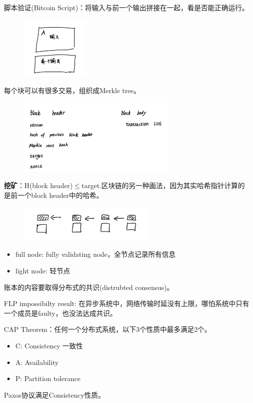 \documentclass[10pt]{ctexart}
\begin{document}
脚本验证(Bitcoin Script)：将输入与前一个输出拼接在一起，看是否能正确运行。
\begin{figure}[H]
    \centering
    \includegraphics[width=0.3\textwidth]{./lecture4/img4.png} 
\end{figure}
每个块可以有很多交易，组织成Merkle tree。
\begin{figure}[H]
    \centering
    \includegraphics[width=0.7\textwidth]{./lecture4/img5.png} 
\end{figure}
\textbf{挖矿}：H(block header)$\le$target.区块链的另一种画法，因为其实哈希指针计算的是前一个block header中的哈希。
\begin{figure}[H]
    \centering
    \includegraphics[width=0.6\textwidth]{./lecture4/img6.png} 
\end{figure}
\begin{itemize}
    \item full node: fully validating node，全节点记录所有信息
    \item light node: 轻节点
\end{itemize}

账本的内容要取得分布式的共识(distrubted consensus)。

FLP impossibilty result: 在异步系统中，网络传输时延没有上限，哪怕系统中只有一个成员是faulty，也没法达成共识。

CAP Theorem：任何一个分布式系统，以下3个性质中最多满足2个。
\begin{itemize}
    \item C: Consistency 一致性
    \item A: Availability
    \item P: Partition tolerance
\end{itemize}
Paxos协议满足Consistency性质。
\end{document}
